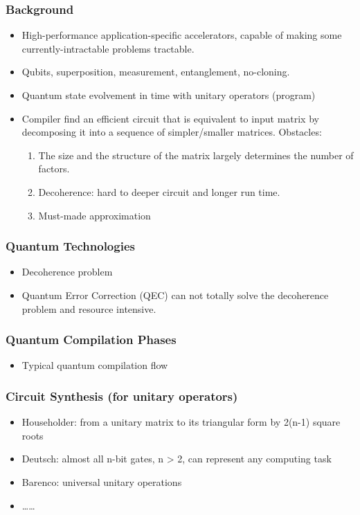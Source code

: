 \documentclass[]{ctexart}
\begin{document}
        \subsubsection*{Background}
            \begin{itemize}
                \item High-performance application-specific accelerators, capable of making some currently-intractable
                problems tractable. 
                \item Qubits, superposition, measurement, entanglement, no-cloning.
                \item Quantum state evolvement in time with unitary operators (program)
                \item Compiler find an efficient circuit that is equivalent to input matrix by decomposing it into a 
                sequence of simpler/smaller matrices. Obstacles:
                    \begin{enumerate}
                        \item The size and the structure of the matrix largely determines the number of factors.
                        \item Decoherence: hard to deeper circuit and longer run time.
                        \item Must-made approximation
                    \end{enumerate}
            \end{itemize}
        \subsubsection*{Quantum Technologies}
            \begin{itemize}
                \item Decoherence problem
                \item Quantum Error Correction (QEC) can not totally solve the decoherence problem and resource intensive.
            \end{itemize}
        \subsubsection*{Quantum Compilation Phases}
            \begin{itemize}
                \item Typical quantum compilation flow
            \end{itemize}
        \subsubsection*{Circuit Synthesis (for unitary operators)}
            \begin{itemize}
                \item Householder: from a unitary matrix to its triangular form by 2(n-1) square roots
                \item Deutsch: almost all n-bit gates, n > 2, can represent any computing task
                \item Barenco: universal unitary operations
                \item \dots\dots
            \end{itemize}
\end{document}
